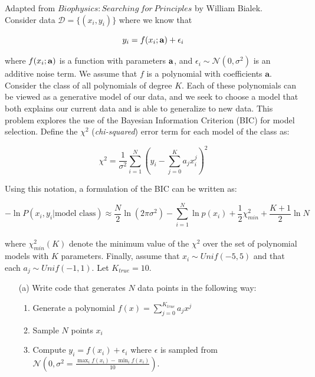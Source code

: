 \documentclass[submit]{harvardml}
\begin{document}
\newpage
\begin{problem}

Adapted from $Biophysics: Searching\ for\ Principles$ by William Bialek.\\

\noindent Consider data $\mathcal{D} = \{(x_i, y_i)\}$ where we know that

    $$y_i = f(x_i ; \bold{a}) + \epsilon_i$$

\noindent where $f(x_i ; \bold{a})$ is a function with parameters $\bold{a}$, and $\epsilon_i \sim \mathcal{N}(0,\sigma^2)$ is an additive noise term.
We assume that $f$ is a polynomial with coefficients $\mathbf{a}$.
Consider the class of all polynomials of degree $K$. Each of these polynomials can be viewed as a generative model of our data, and we seek
to choose a model that both explains our current data and is able to generalize to new data. This problem explores the use of the Bayesian Information Criterion (BIC)
for model selection. Define the $\chi^2$ (\textit{chi-squared}) error term for each model of the class as:

$$\chi^2 =  \frac{1}{\sigma^2} \sum_{i=1}^N \left( y_i - \sum_{j=0}^K a_j x_i^j \right)^2 $$

\noindent Using this notation, a formulation of the BIC can be written as: 

$$-\ln P({x_i,y_i} | \text{model class} ) \approx \frac{N}{2} \ln (2\pi \sigma^2) - \sum_{i=1}^N \ln p(x_i) + \frac{1}{2} \chi^2_{min} + \frac{K+1}{2} \ln N $$ \\

\noindent where $\chi^2_{min}(K)$ denote the minimum value of the $\chi^2$ over the set of polynomial models with $K$ parameters. 
Finally, assume that $x_i \sim Unif(-5,5)$ and that each $a_j \sim Unif(-1,1)$. Let $K_{true} = 10$.

    \begin{itemize}
    
        \item[(a)] Write code that generates $N$ data points in the following way:
            \begin{enumerate}
                \item Generate a polynomial $f(x) = \sum_{j = 0}^{K_{true}} a_j x^j$ 
                \item Sample $N$ points $x_i$
                \item Compute $y_i = f(x_i) + \epsilon_i$ where $\epsilon$ is sampled from $\mathcal{N}(0, \sigma^2 = \frac{ \max_i f(x_i) - \min_i f(x_i) }{10})$.
            \end{enumerate}
        

\end{itemize}
\end{problem}
\end{document}
